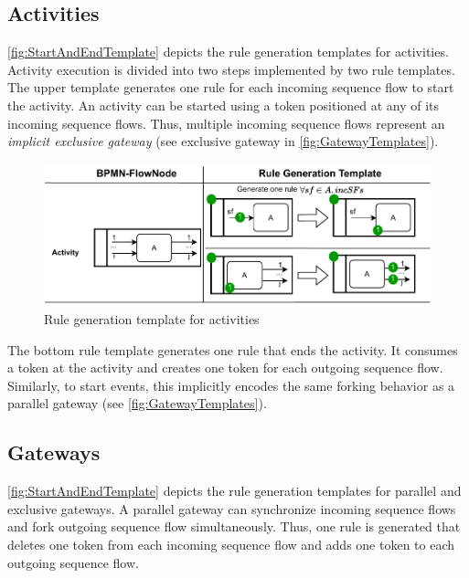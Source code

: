 \documentclass[submission, copyright, creativecommons]{eptcs}
\begin{document}
\subsection{Activities}

\autoref{fig:StartAndEndTemplate} depicts the rule generation templates for activities.
Activity execution is divided into two steps implemented by two rule templates.
The upper template generates one rule for each incoming sequence flow to start the activity.
An activity can be started using a token positioned at any of its incoming sequence flows.
Thus, multiple incoming sequence flows represent an \textit{implicit exclusive gateway} (see exclusive gateway in \autoref{fig:GatewayTemplates}).

\begin{figure}[h]
    \centering
    \includegraphics[width=1\textwidth]{images/activities_template.pdf}
    \caption{Rule generation template for activities}
    \label{fig:ActivityTemplates}
\end{figure}

The bottom rule template generates one rule that ends the activity.
It consumes a token at the activity and creates one token for each outgoing sequence flow.
Similarly, to start events, this implicitly encodes the same forking behavior as a parallel gateway (see \autoref{fig:GatewayTemplates}). 

\subsection{Gateways}
\autoref{fig:StartAndEndTemplate} depicts the rule generation templates for parallel and exclusive gateways.
A parallel gateway can synchronize incoming sequence flows and fork outgoing sequence flow simultaneously.
Thus, one rule is generated that deletes one token from each incoming sequence flow and adds one token to each outgoing sequence flow.
\end{document}

